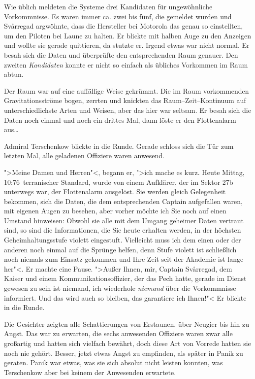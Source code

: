 Wie üblich meldeten die Systeme drei Kandidaten für ungewöhnliche Vorkommnisse. Es waren immer ca. zwei bis fünf, die gemeldet wurden und Svårregad argwöhnte, dass die Hersteller bei Motorola das genau so einstellten, um den Piloten bei Laune zu halten. Er blickte mit halben Auge zu den Anzeigen und wollte sie gerade quittieren, da stutzte er. Irgend etwas war nicht normal. Er besah sich die Daten und überprüfte den entsprechenden Raum genauer. Den zweiten \emph{Kandidaten} konnte er nicht so einfach als übliches Vorkommen im Raum abtun.

Der Raum war auf eine auffällige Weise gekrümmt. Die im Raum vorkommenden Gravitationsströme bogen, zerrten und knickten das Raum--Zeit--Kontinuum auf unterschiedlichste Arten und Weisen, aber das hier war seltsam. Er besah sich die Daten noch einmal und noch ein drittes Mal, dann löste er den Flottenalarm aus\dots

\mbox{}

Admiral Terschenkow blickte in die Runde. Gerade schloss sich die Tür zum letzten Mal, alle geladenen Offiziere waren anwesend.

">Meine Damen und Herren"<, begann er, ">ich mache es kurz. Heute Mittag, 10:76~terranischer Standard, wurde von einem Aufklärer, der im Sektor \textsf{27b} unterwegs war, der Flottenalarm ausgelöst. Sie werden gleich Gelegenheit bekommen, sich die Daten, die dem entsprechenden Captain aufgefallen waren, mit eigenen Augen zu besehen, aber vorher möchte ich Sie noch auf einen Umstand hinweisen: Obwohl sie alle mit dem Umgang geheimer Daten vertraut sind, so sind die Informationen, die Sie heute erhalten werden, in der höchsten Geheimhaltungsstufe violett eingestuft. Vielleicht muss ich dem einen oder der anderen noch einmal auf die Sprünge helfen, denn Stufe violett ist schließlich noch niemals zum Einsatz gekommen und Ihre Zeit seit der Akademie ist lange her"<. Er machte eine Pause. ">Außer Ihnen, mir, Captain Svårregad, dem Kaiser und einem Kommunikationsoffizier, der das Pech hatte, gerade im Dienst gewesen zu sein ist niemand, ich wiederhole \emph{niemand} über die Vorkommnisse informiert. Und das wird auch so bleiben, das garantiere ich Ihnen!"< Er blickte in die Runde.

Die Gesichter zeigten alle Schattierungen von Erstaunen, über Neugier bis hin zu Angst. Das war zu erwarten, die sechs anwesenden Offiziere waren zwar alle großartig und hatten sich vielfach bewährt, doch diese Art von Vorrede hatten sie noch nie gehört. Besser, jetzt etwas Angst zu empfinden, als später in Panik zu geraten. Panik war etwas, was sie sich absolut nicht leisten konnten, was Terschenkow aber bei keinem der Anwesenden erwartete.

